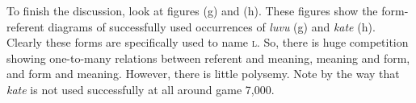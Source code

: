 To finish the discussion, look at figures (g) and (h). These figures show the form-referent diagrams of successfully used occurrences of {\it luvu} (g) and {\it kate} (h). Clearly these forms are specifically used to name \textsc{l}. So, there is huge competition showing one-to-many relations between referent and meaning, meaning and form, and form and meaning. However, there is little polysemy. Note by the way that {\it kate} is not used successfully at all around game 7,000.

\begin{figure}[b]
	\centering
\end{figure}
